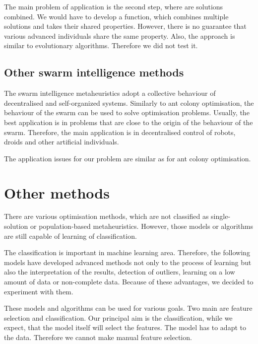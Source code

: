 \documentclass[
  print, %
  Table,   %
  nolof,     %
  nolot,     %
  11pt, %
  oneside  %
]{fithesis3}
\begin{document}
The main problem of application is the second step, where are solutions combined. We would have to develop a function, which combines multiple solutions and takes their shared properties. However, there is no guarantee that various advanced individuals share the same property. Also, the approach is similar to evolutionary algorithms. Therefore we did not test it.

\subsection{Other swarm intelligence methods}
\label{subsec:opt-popul-si}

The swarm intelligence metaheuristics adopt a collective behaviour of decentralised and self-organized systems. Similarly to ant colony optimisation, the behaviour of the swarm can be used to solve optimisation problems. Usually, the best application is in problems that are close to the origin of the behaviour of the swarm. Therefore, the main application is in decentralised control of robots, droids and other artificial individuals.

The application issues for our problem are similar as for ant colony optimisation.

\section{Other methods}
\label{sec:opt-other}

There are various optimisation methods, which are not classified as single-solution or population-based metaheuristics. However, those models or algorithms are still capable of learning of classification.

The classification is important in machine learning area. Therefore, the following models have developed advanced methods not only to the process of learning but also the interpretation of the results, detection of outliers, learning on a low amount of data or non-complete data. Because of these advantages, we decided to experiment with them.

These models and algorithms can be used for various goals. Two main are feature selection and classification. Our principal aim is the classification, while we expect, that the model itself will select the features. The model has to adapt to the data. Therefore we cannot make manual feature selection.

\end{document}
